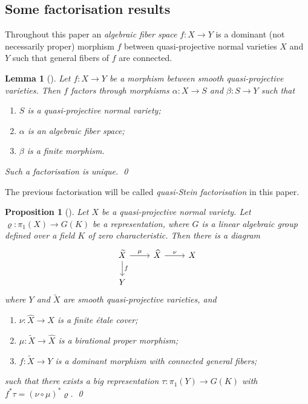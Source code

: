 \documentclass[11pt,english]{smfart}
\theoremstyle{plain}
\newtheorem{lem}[thm]{Lemma}
\newtheorem{proposition}[thm]{Proposition}
\theoremstyle{definition}
\theoremstyle{remark}
\numberwithin{equation}{subsection}
\theoremstyle{plain}
\begin{document}
 \subsection{Some factorisation results}\label{sec:fac}
Throughout this paper an \emph{algebraic fiber space} $f:X\to Y$ is a dominant (not necessarily proper) morphism $f$ between quasi-projective normal varieties $X$ and $Y$ such that   general fibers of $f$ are connected.  
\begin{lem}[]\label{lem:Stein}
	Let $f:X\to Y$ be a morphism between smooth quasi-projective varieties. Then $f$ factors through   morphisms $\alpha:X\to S$ and $\beta:S\to Y$ such that
	\begin{enumerate}[label={\rm (\alph*)}]
		\item $S$ is a quasi-projective normal variety;
		\item   $\alpha$ is an algebraic fiber space;
		\item $\beta$ is a finite morphism.
	\end{enumerate}
	Such a factorisation is unique. \qed
\end{lem} 
The previous factorisation will be called \emph{quasi-Stein factorisation} in this paper.  
\begin{proposition}[]\label{lem:kollar}
	Let $X$ be a quasi-projective normal variety.  Let $\varrho:\pi_1(X)\to G(K)$ be a representation, where $G$ is a linear algebraic group defined over a field $K$ of zero characteristic.  Then there is a diagram
	\[
	\begin{tikzcd}
		\widetilde{X} \arrow[r, "\mu"] \arrow[d, "f"] & \widehat{X} \arrow[r, "\nu"] & X\\
		Y                                             &  &
	\end{tikzcd}
	\]
	where \(Y\) and \(\widetilde{X}\) are smooth quasi-projective varieties, and
	\begin{enumerate}[label=(\alph*)]
		\item $\nu:\widehat{X}\to X$ is a finite étale cover;
		\item \(\mu : \widetilde{X} \to \widehat{X}\) is a birational proper morphism;
		\item $f : \widetilde{X} \to Y$ is a dominant morphism with connected general fibers;
	\end{enumerate}
	such that there exists a big representation \(\tau : \pi_{1}(Y) \to G(K)\) with  $f^*\tau=(\nu\circ \mu)^*\varrho$.   \qed \end{proposition}
 
\end{document}
